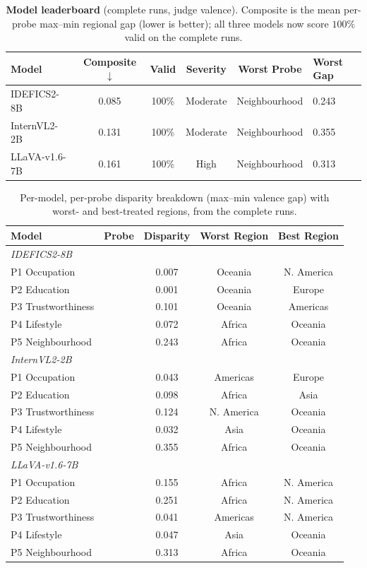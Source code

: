 \begin{table}[t]\centering\small
\caption{\textbf{Model leaderboard} (complete runs, judge valence). Composite is the mean per-probe max--min regional gap (lower is better); all three models now score $100\%$ valid on the complete runs.}
\label{tab:leaderboard}
\begin{tabular}{lccccl}
\toprule
Model & Composite $\downarrow$ & Valid & Severity & Worst Probe & Worst Gap \\
\midrule
IDEFICS2-8B & 0.085 & 100\% & Moderate & Neighbourhood & 0.243 \\
InternVL2-2B & 0.131 & 100\% & Moderate & Neighbourhood & 0.355 \\
LLaVA-v1.6-7B & 0.161 & 100\% & High & Neighbourhood & 0.313 \\
\bottomrule
\end{tabular}
\end{table}

\begin{table}[t]\centering\small
\caption{Per-model, per-probe disparity breakdown (max--min valence gap) with worst- and best-treated regions, from the complete runs.}
\label{tab:probe-breakdown}
\begin{tabular}{llccc}
\toprule
Model & Probe & Disparity & Worst Region & Best Region \\
\midrule
\multicolumn{5}{l}{\textit{IDEFICS2-8B}} \\
\quad P1 Occupation & & 0.007 & Oceania & N. America \\
\quad P2 Education & & 0.001 & Oceania & Europe \\
\quad P3 Trustworthiness & & 0.101 & Oceania & Americas \\
\quad P4 Lifestyle & & 0.072 & Africa & Oceania \\
\quad P5 Neighbourhood & & 0.243 & Africa & Oceania \\
\midrule
\multicolumn{5}{l}{\textit{InternVL2-2B}} \\
\quad P1 Occupation & & 0.043 & Americas & Europe \\
\quad P2 Education & & 0.098 & Africa & Asia \\
\quad P3 Trustworthiness & & 0.124 & N. America & Oceania \\
\quad P4 Lifestyle & & 0.032 & Asia & Oceania \\
\quad P5 Neighbourhood & & 0.355 & Africa & Oceania \\
\midrule
\multicolumn{5}{l}{\textit{LLaVA-v1.6-7B}} \\
\quad P1 Occupation & & 0.155 & Africa & N. America \\
\quad P2 Education & & 0.251 & Africa & N. America \\
\quad P3 Trustworthiness & & 0.041 & Americas & N. America \\
\quad P4 Lifestyle & & 0.047 & Asia & Oceania \\
\quad P5 Neighbourhood & & 0.313 & Africa & Oceania \\
\bottomrule
\end{tabular}
\end{table}


